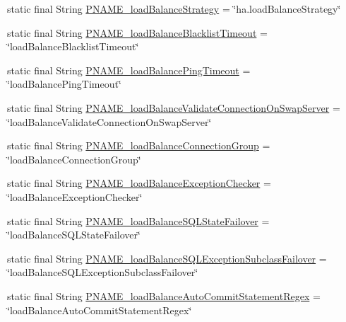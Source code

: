 \begin{DoxyCompactItemize}
static final String \mbox{\hyperlink{classcom_1_1mysql_1_1cj_1_1conf_1_1_property_definitions_a424755d9ad4d03c2ec265f04011dc434}{P\+N\+A\+M\+E\+\_\+load\+Balance\+Strategy}} = \char`\"{}ha.\+load\+Balance\+Strategy\char`\"{}
\item 
static final String \mbox{\hyperlink{classcom_1_1mysql_1_1cj_1_1conf_1_1_property_definitions_a923a66c4faf2ac3c3462e09cf812e25e}{P\+N\+A\+M\+E\+\_\+load\+Balance\+Blacklist\+Timeout}} = \char`\"{}load\+Balance\+Blacklist\+Timeout\char`\"{}
\item 
static final String \mbox{\hyperlink{classcom_1_1mysql_1_1cj_1_1conf_1_1_property_definitions_a3e1a704709f3df18a1d560019c5b6037}{P\+N\+A\+M\+E\+\_\+load\+Balance\+Ping\+Timeout}} = \char`\"{}load\+Balance\+Ping\+Timeout\char`\"{}
\item 
static final String \mbox{\hyperlink{classcom_1_1mysql_1_1cj_1_1conf_1_1_property_definitions_abf0b7a75dd3ecfe1c9d1ac1999b8a8ad}{P\+N\+A\+M\+E\+\_\+load\+Balance\+Validate\+Connection\+On\+Swap\+Server}} = \char`\"{}load\+Balance\+Validate\+Connection\+On\+Swap\+Server\char`\"{}
\item 
static final String \mbox{\hyperlink{classcom_1_1mysql_1_1cj_1_1conf_1_1_property_definitions_a7fd59b540926d71449dc767ab16c67e0}{P\+N\+A\+M\+E\+\_\+load\+Balance\+Connection\+Group}} = \char`\"{}load\+Balance\+Connection\+Group\char`\"{}
\item 
static final String \mbox{\hyperlink{classcom_1_1mysql_1_1cj_1_1conf_1_1_property_definitions_a5bda2d03807c3dcc3b595d01bbbb1d21}{P\+N\+A\+M\+E\+\_\+load\+Balance\+Exception\+Checker}} = \char`\"{}load\+Balance\+Exception\+Checker\char`\"{}
\item 
static final String \mbox{\hyperlink{classcom_1_1mysql_1_1cj_1_1conf_1_1_property_definitions_a5e4e8032a45cc35b0d20618e3af00c28}{P\+N\+A\+M\+E\+\_\+load\+Balance\+S\+Q\+L\+State\+Failover}} = \char`\"{}load\+Balance\+S\+Q\+L\+State\+Failover\char`\"{}
\item 
static final String \mbox{\hyperlink{classcom_1_1mysql_1_1cj_1_1conf_1_1_property_definitions_ab66609e6e7b93718aae19d1efcf660f3}{P\+N\+A\+M\+E\+\_\+load\+Balance\+S\+Q\+L\+Exception\+Subclass\+Failover}} = \char`\"{}load\+Balance\+S\+Q\+L\+Exception\+Subclass\+Failover\char`\"{}
\item 
static final String \mbox{\hyperlink{classcom_1_1mysql_1_1cj_1_1conf_1_1_property_definitions_acb3118bf171ccd8a2f027eecdf45d408}{P\+N\+A\+M\+E\+\_\+load\+Balance\+Auto\+Commit\+Statement\+Regex}} = \char`\"{}load\+Balance\+Auto\+Commit\+Statement\+Regex\char`\"{}

\end{DoxyCompactItemize}
